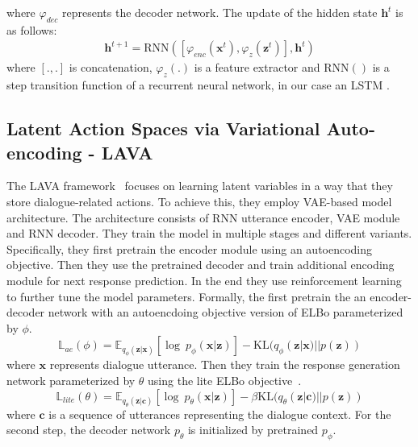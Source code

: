 where $\varphi_{dec}$ represents the decoder network.
The update of the hidden state $\mathbf{h}^t$ is as follows:
\begin{equation}
    \label{eq:hidden_update}
    \begin{gathered}
        \mathbf{h}^{t+1} = \text{RNN}([\varphi_{enc}(\mathbf{x}^t),\varphi_{z}(\mathbf{z}^t)], \mathbf{h}^t)
    \end{gathered}
\end{equation}
where $[.,.]$ is concatenation, $\varphi_z(.)$ is a feature extractor and $\text{RNN}()$ is a step transition function of a recurrent neural network, in our case an LSTM \cite{hochreiter1997}.

\subsection{Latent Action Spaces via Variational Auto-encoding - LAVA}
\label{02:sec:lava}
The LAVA framework~\cite{lubis-etal-2020-lava} focuses on learning latent variables in a way that they store dialogue-related actions.
To achieve this, they employ VAE-based model architecture.
The architecture consists of RNN utterance encoder, VAE module and RNN decoder.
They train the model in multiple stages and different variants.
Specifically, they first pretrain the encoder module using an autoencoding objective.
Then they use the pretrained decoder and train additional encoding module for next response prediction.
In the end they use reinforcement learning to further tune the model parameters.
Formally, the first pretrain the an encoder-decoder network with an autoencdoing objective version of ELBo parameterized by $\phi$.
\begin{equation}
    \mathbb{L}_{ae}(\phi) = \mathbb{E}_{q_{\phi}(\mathbf{z}|\mathbf{x})}[\log~p_{\phi}(\mathbf{x}|\mathbf{z})] -\mathrm{KL}(q_{\phi}(\mathbf{z}|\mathbf{x})||p(\mathbf{z}))
\end{equation}
where $\mathbf{x}$ represents dialogue utterance.
Then they train the response generation network parameterized by $\theta$ using the lite ELBo objective~\cite{lubis-etal-2020-lava}.
\begin{equation}
    \mathbb{L}_{lite}(\theta) = \mathbb{E}_{q_{\theta}(\mathbf{z}|\mathbf{c})}[\log~p_{\theta}(\mathbf{x}|\mathbf{z})] - \beta\mathrm{KL}(q_{\theta}(\mathbf{z}|\mathbf{c})||p(\mathbf{z}))
\end{equation}
where $\mathbf{c}$ is a sequence of utterances representing the dialogue context.
For the second step, the decoder network $p_{\theta}$ is initialized by pretrained $p_{\phi}$.

